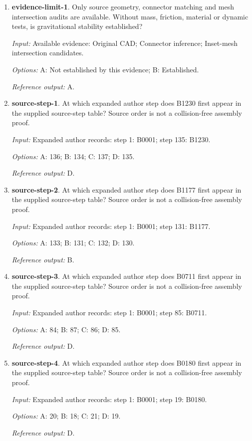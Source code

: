 \begin{enumerate}
\item \textbf{evidence-limit-1}. Only source geometry, connector matching and mesh intersection audits are available. Without mass, friction, material or dynamic tests, is gravitational stability established?\par {\small \textit{Input:} Available evidence: Original CAD; Connector inference; Inset-mesh intersection candidates. \par\textit{Options:} A: Not established by this evidence; B: Established. \par\textit{Reference output:} A.}
\item \textbf{source-step-1}. At which expanded author step does B1230 first appear in the supplied source-step table? Source order is not a collision-free assembly proof.\par {\small \textit{Input:} Expanded author records: step 1: B0001; step 135: B1230. \par\textit{Options:} A: 136; B: 134; C: 137; D: 135. \par\textit{Reference output:} D.}
\item \textbf{source-step-2}. At which expanded author step does B1177 first appear in the supplied source-step table? Source order is not a collision-free assembly proof.\par {\small \textit{Input:} Expanded author records: step 1: B0001; step 131: B1177. \par\textit{Options:} A: 133; B: 131; C: 132; D: 130. \par\textit{Reference output:} B.}
\item \textbf{source-step-3}. At which expanded author step does B0711 first appear in the supplied source-step table? Source order is not a collision-free assembly proof.\par {\small \textit{Input:} Expanded author records: step 1: B0001; step 85: B0711. \par\textit{Options:} A: 84; B: 87; C: 86; D: 85. \par\textit{Reference output:} D.}
\item \textbf{source-step-4}. At which expanded author step does B0180 first appear in the supplied source-step table? Source order is not a collision-free assembly proof.\par {\small \textit{Input:} Expanded author records: step 1: B0001; step 19: B0180. \par\textit{Options:} A: 20; B: 18; C: 21; D: 19. \par\textit{Reference output:} D.}

\end{enumerate}
